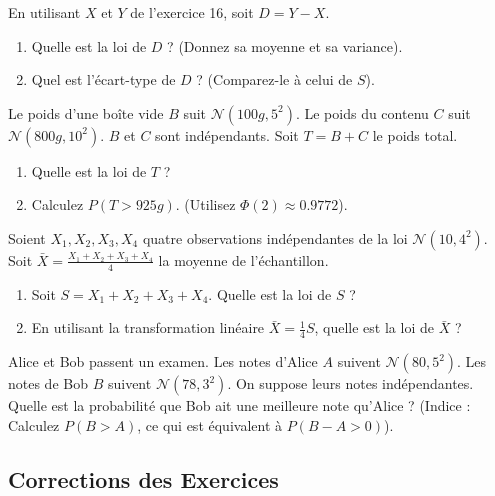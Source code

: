 \begin{exercicebox}
En utilisant $X$ et $Y$ de l'exercice 16, soit $D = Y - X$.
\begin{enumerate}
    \item Quelle est la loi de $D$ ? (Donnez sa moyenne et sa variance).
    \item Quel est l'écart-type de $D$ ? (Comparez-le à celui de $S$).
\end{enumerate}
\end{exercicebox}

\begin{exercicebox}
Le poids d'une boîte vide $B$ suit $\mathcal{N}(100g, 5^2)$. Le poids du contenu $C$ suit $\mathcal{N}(800g, 10^2)$. $B$ et $C$ sont indépendants.
Soit $T = B+C$ le poids total.
\begin{enumerate}
    \item Quelle est la loi de $T$ ?
    \item Calculez $P(T > 925g)$. (Utilisez $\Phi(2) \approx 0.9772$).
\end{enumerate}
\end{exercicebox}

\begin{exercicebox}
Soient $X_1, X_2, X_3, X_4$ quatre observations indépendantes de la loi $\mathcal{N}(10, 4^2)$.
Soit $\bar{X} = \frac{X_1 + X_2 + X_3 + X_4}{4}$ la moyenne de l'échantillon.
\begin{enumerate}
    \item Soit $S = X_1+X_2+X_3+X_4$. Quelle est la loi de $S$ ?
    \item En utilisant la transformation linéaire $\bar{X} = \frac{1}{4}S$, quelle est la loi de $\bar{X}$ ?
\end{enumerate}
\end{exercicebox}

\begin{exercicebox}
Alice et Bob passent un examen. Les notes d'Alice $A$ suivent $\mathcal{N}(80, 5^2)$. Les notes de Bob $B$ suivent $\mathcal{N}(78, 3^2)$. On suppose leurs notes indépendantes.
Quelle est la probabilité que Bob ait une meilleure note qu'Alice ?
(Indice : Calculez $P(B > A)$, ce qui est équivalent à $P(B - A > 0)$).
\end{exercicebox}

\subsection{Corrections des Exercices}

